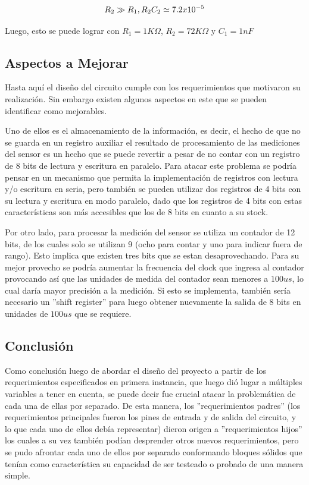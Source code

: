 \[
    R_{2}\gg R_{1},\\
    R_{2}C_{2}\simeq7.2x10^{-5}
\]

Luego, esto se puede lograr con $R_{1}=1K\varOmega$, $R_{2}=72K\varOmega$
y $C_{1}=1nF$

\subsection{Aspectos a Mejorar}

Hasta aquí el diseño del circuito cumple con los requerimientos que
motivaron su realización. Sin embargo existen algunos aspectos en
este que se pueden identificar como mejorables.

Uno de ellos es el almacenamiento de la información, es decir, el
hecho de que no se guarda en un registro auxiliar el resultado de
procesamiento de las mediciones del sensor es un hecho que se puede
revertir a pesar de no contar con un registro de 8 bits de lectura
y escritura en paralelo. Para atacar este problema se podría pensar
en un mecanismo que permita la implementación de registros con lectura
y/o escritura en seria, pero también se pueden utilizar dos registros
de 4 bits con su lectura y escritura en modo paralelo, dado que los
registros de 4 bits con estas características son más accesibles que
los de 8 bits en cuanto a su stock.

Por otro lado, para procesar la medición del sensor se utiliza un
contador de 12 bits, de los cuales solo se utilizan 9 (ocho para contar
y uno para indicar fuera de rango). Esto implica que existen tres
bits que se estan desaprovechando. Para su mejor provecho se podría
aumentar la frecuencia del clock que ingresa al contador provocando
así que las unidades de medida del contador sean menores a $100us$,
lo cual daría mayor precisión a la medición. Si esto se implementa,
también sería necesario un ''shift register'' para luego obtener
nuevamente la salida de 8 bits en unidades de $100us$ que se requiere.

\subsection{Conclusión}

Como conclusión luego de abordar el diseño del proyecto a partir de
los requerimientos especificados en primera instancia, que luego dió
lugar a múltiples variables a tener en cuenta, se puede decir fue
crucial atacar la problemática de cada una de ellas por separado.
De esta manera, los ''requerimientos padres'' (los requerimientos
principales fueron los pines de entrada y de salida del circuito,
y lo que cada uno de ellos debía representar) dieron origen a ''requerimientos
hijos'' los cuales a su vez también podían desprender otros nuevos
requerimientos, pero se pudo afrontar cada uno de ellos por separado
conformando bloques sólidos que tenían como característica su capacidad
de ser testeado o probado de una manera simple.

